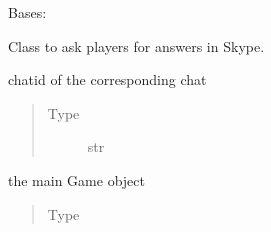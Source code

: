 \documentclass[letterpaper,10pt,english]{sphinxmanual}
\begin{document}
\begin{fulllineitems}
\label{\detokenize{chatwolf:chatwolf.skypecommands.SkypeCommands}}
Bases: 

Class to ask players for answers in Skype.

\begin{fulllineitems}
\label{\detokenize{chatwolf:chatwolf.skypecommands.SkypeCommands.chatid}}
chatid of the corresponding chat
\begin{quote}\begin{description}
\item[{Type}] \leavevmode
str

\end{description}\end{quote}

\end{fulllineitems}


\begin{fulllineitems}
\label{\detokenize{chatwolf:chatwolf.skypecommands.SkypeCommands.game}}
the main Game object
\begin{quote}\begin{description}
\item[{Type}] \leavevmode
{\hyperref[\detokenize{chatwolf:chatwolf.game.Game}]{}}

\end{description}\end{quote}


\end{fulllineitems}
\end{fulllineitems}
\end{document}
